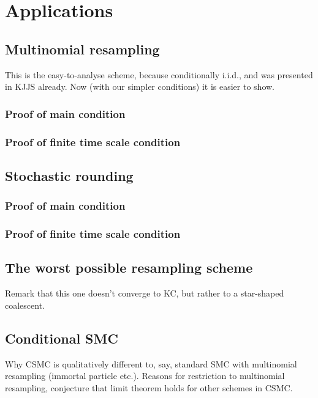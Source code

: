 \chapter{Applications}


\section{Multinomial resampling}
This is the easy-to-analyse scheme, because conditionally i.i.d., and was presented in KJJS already. Now (with our simpler conditions) it is easier to show.

\subsection{Proof of main condition}

\subsection{Proof of finite time scale condition}


\section{Stochastic rounding}

\subsection{Proof of main condition}

\subsection{Proof of finite time scale condition}


\section{The worst possible resampling scheme}
Remark that this one doesn't converge to KC, but rather to a star-shaped coalescent.


\section{Conditional SMC}
Why CSMC is qualitatively different to, say, standard SMC with multinomial resampling (immortal particle etc.). Reasons for restriction to multinomial resampling, conjecture that limit theorem holds for other schemes in CSMC.

